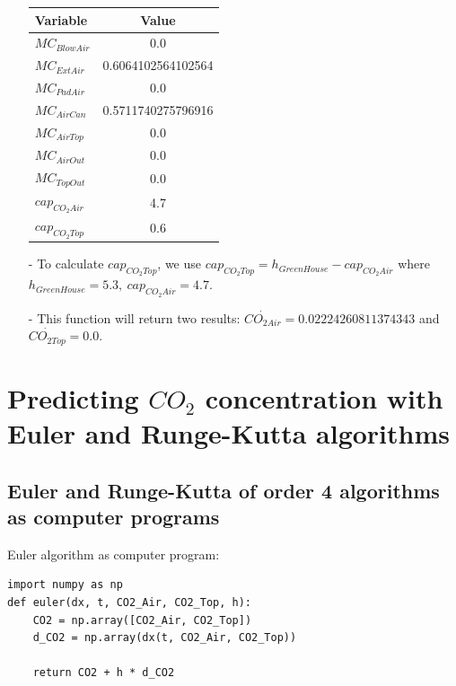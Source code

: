 \documentclass[a4paper]{article}
\numberwithin{equation}{section}
\begin{document}
\begin{itemize}
        \begin{table}[H]
          \centering
          \begin{tabular}{@{}lS[table-format=1.17]@{}}
            \toprule
            \textbf{Variable} & \textbf{Value}     \\
            \midrule
            \(MC_{BlowAir}\)  & 0.0                \\
            \(MC_{ExtAir}\)   & 0.6064102564102564 \\
            \(MC_{PadAir}\)   & 0.0                \\
            \(MC_{AirCan}\)   & 0.5711740275796916 \\
            \(MC_{AirTop}\)   & 0.0                \\
            \(MC_{AirOut}\)   & 0.0                \\
            \(MC_{TopOut}\)   & 0.0                \\
            \(cap_{CO_2Air}\) & 4.7                \\
            \(cap_{CO_2Top}\) & 0.6                \\
            \bottomrule
          \end{tabular}
        \end{table}
  \item[-] To calculate \(cap_{CO_2Top}\), we use \(cap_{CO_2Top} = h_{GreenHouse} - cap_{CO_2Air}\) where \(h_{GreenHouse} = 5.3,\ cap_{CO_2Air} = 4.7\).
  \item[-] This function will return two results: \(\dot{CO_{2Air}} = 0.02224260811374343\) and \(\dot{CO_{2Top}} = 0.0\).
\end{itemize}


\newpage
\section{Predicting \texorpdfstring{\(CO_2\)}{} concentration with Euler and Runge-Kutta algorithms}
\subsection{Euler and Runge-Kutta of order 4 algorithms as computer programs}
Euler algorithm as computer program:
\begin{mdframed}[leftline=false,rightline=false,backgroundcolor=magenta!10,nobreak=true]
  \begin{verbatim}
import numpy as np
def euler(dx, t, CO2_Air, CO2_Top, h):
    CO2 = np.array([CO2_Air, CO2_Top])
    d_CO2 = np.array(dx(t, CO2_Air, CO2_Top))

    return CO2 + h * d_CO2
  \end{verbatim}
\end{mdframed}
\end{document}
